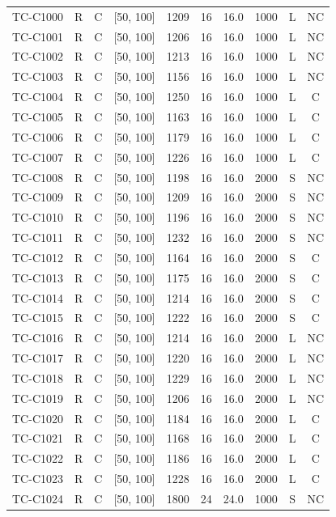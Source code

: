 \begin{longtable}{lccccccccc}
TC-C1000 & R & C & [50, 100] & 1209 & 16 & 16.0 & 1000 & L & NC \\
TC-C1001 & R & C & [50, 100] & 1206 & 16 & 16.0 & 1000 & L & NC \\
TC-C1002 & R & C & [50, 100] & 1213 & 16 & 16.0 & 1000 & L & NC \\
TC-C1003 & R & C & [50, 100] & 1156 & 16 & 16.0 & 1000 & L & NC \\
TC-C1004 & R & C & [50, 100] & 1250 & 16 & 16.0 & 1000 & L & C \\
TC-C1005 & R & C & [50, 100] & 1163 & 16 & 16.0 & 1000 & L & C \\
TC-C1006 & R & C & [50, 100] & 1179 & 16 & 16.0 & 1000 & L & C \\
TC-C1007 & R & C & [50, 100] & 1226 & 16 & 16.0 & 1000 & L & C \\
TC-C1008 & R & C & [50, 100] & 1198 & 16 & 16.0 & 2000 & S & NC \\
TC-C1009 & R & C & [50, 100] & 1209 & 16 & 16.0 & 2000 & S & NC \\
TC-C1010 & R & C & [50, 100] & 1196 & 16 & 16.0 & 2000 & S & NC \\
TC-C1011 & R & C & [50, 100] & 1232 & 16 & 16.0 & 2000 & S & NC \\
TC-C1012 & R & C & [50, 100] & 1164 & 16 & 16.0 & 2000 & S & C \\
TC-C1013 & R & C & [50, 100] & 1175 & 16 & 16.0 & 2000 & S & C \\
TC-C1014 & R & C & [50, 100] & 1214 & 16 & 16.0 & 2000 & S & C \\
TC-C1015 & R & C & [50, 100] & 1222 & 16 & 16.0 & 2000 & S & C \\
TC-C1016 & R & C & [50, 100] & 1214 & 16 & 16.0 & 2000 & L & NC \\
TC-C1017 & R & C & [50, 100] & 1220 & 16 & 16.0 & 2000 & L & NC \\
TC-C1018 & R & C & [50, 100] & 1229 & 16 & 16.0 & 2000 & L & NC \\
TC-C1019 & R & C & [50, 100] & 1206 & 16 & 16.0 & 2000 & L & NC \\
TC-C1020 & R & C & [50, 100] & 1184 & 16 & 16.0 & 2000 & L & C \\
TC-C1021 & R & C & [50, 100] & 1168 & 16 & 16.0 & 2000 & L & C \\
TC-C1022 & R & C & [50, 100] & 1186 & 16 & 16.0 & 2000 & L & C \\
TC-C1023 & R & C & [50, 100] & 1228 & 16 & 16.0 & 2000 & L & C \\
TC-C1024 & R & C & [50, 100] & 1800 & 24 & 24.0 & 1000 & S & NC \\

\end{longtable}
